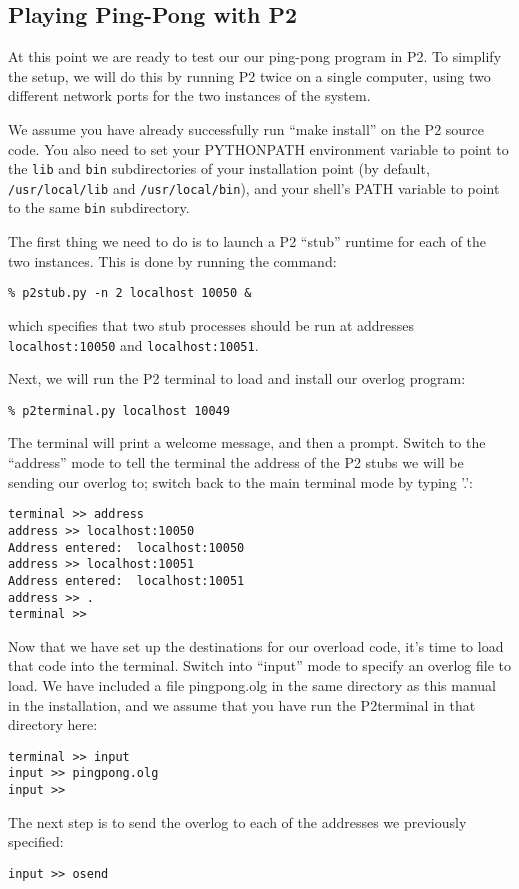 \documentclass{article}
\begin{document}


\subsection{Playing Ping-Pong with P2}
At this point we are ready to test our our ping-pong program in P2.
To simplify the setup, we will do this by running P2 twice on a single
computer, using two different network ports for the two instances of
the system.

We assume you have already successfully run ``make install'' on the P2
source code.  You also need to set your PYTHONPATH environment
variable to point to the \lstinline$lib$ and \lstinline$bin$
subdirectories of your installation point (by default,
\lstinline$/usr/local/lib$ and \lstinline$/usr/local/bin$), and your
shell's PATH variable to point to the same \lstinline$bin$
subdirectory.

The first thing we need to do is to launch a P2 ``stub'' runtime for
each of the two instances.  This is done by running the command:
\begin{verbatim}
% p2stub.py -n 2 localhost 10050 &
\end{verbatim}
which specifies that two stub processes should be run at addresses
\lstinline$localhost:10050$ and \lstinline$localhost:10051$.

Next, we will run the P2 terminal to load and install our overlog
program:
\begin{verbatim}
% p2terminal.py localhost 10049
\end{verbatim}
The terminal will print a welcome message, and then a prompt.  Switch
to the ``address'' mode to tell the terminal the address of the P2
stubs we will be sending our overlog to; switch back to the main
terminal mode by typing '.':
\begin{verbatim}
terminal >> address
address >> localhost:10050
Address entered:  localhost:10050
address >> localhost:10051
Address entered:  localhost:10051
address >> .
terminal >> 
\end{verbatim}
Now that we have set up the destinations for our overload code, it's
time to load that code into the terminal.  Switch into ``input'' mode
to specify an overlog file to load.  We have included a file
pingpong.olg in the same directory as this manual in the installation,
and we assume that you have run the P2terminal in that directory here:
\begin{verbatim}
terminal >> input
input >> pingpong.olg
input >>
\end{verbatim}
The next step is to send the overlog to each of the addresses we
previously specified:
\begin{verbatim}
input >> osend
\end{verbatim}
\end{document}
